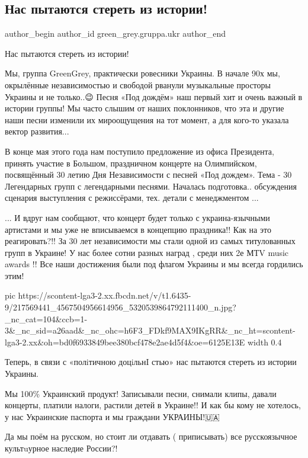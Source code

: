  
 
 
 
 
 
\subsection{Нас пытаются стереть из истории!}
\label{sec:27_07_2021.fb.green_grey.gruppa.ukr.1.grin_grey_ofis_prezidenta_jazyk_mova}
 
\ifcmt
 author_begin
   author_id green_grey.gruppa.ukr
 author_end
\fi

Нас пытаются стереть из истории!

Мы, группа GreenGrey, практически ровесники Украины. В начале 90х мы,
окрылённые независимостью и свободой рванули музыкальные просторы Украины и не
только..😉 Песня «Под дождём» наш первый хит и очень важный в истории группы!
Мы часто слышим от наших поклонников, что эта и другие наши песни изменили их
мироощущения на тот момент, а для кого-то указала вектор развития...

В конце мая этого года нам поступило предложение из офиса Президента, принять
участие в Большом, праздничном концерте на Олимпийском, посвящённый 30 летию
Дня Независимости с песней «Под дождем». Тема - 30 Легендарных групп с
легендарными песнями. Началась подготовка.. обсуждения сценария выступления с
режиссёрами, тех. детали с менеджментом ...

... И вдруг нам сообщают, что концерт будет только с украина-язычными
артистами и мы уже не вписываемся в концепцию праздника!! Как на это
реагировать?!! За 30 лет независимости мы стали одной из самых титулованных
групп в Украине! У нас более сотни разных наград , среди них 2е МТV music
awards !! Все наши достижения были под флагом Украины и мы всегда гордились
этим!

\ifcmt
  pic https://scontent-lga3-2.xx.fbcdn.net/v/t1.6435-9/217569441_4567504956614956_5320539864792111400_n.jpg?_nc_cat=104&ccb=1-3&_nc_sid=a26aad&_nc_ohc=h6F3_FDkf9MAX9IKgRR&_nc_ht=scontent-lga3-2.xx&oh=bd0f6933849bee380bcf478e2ae4d5f4&oe=6125E13E
  width 0.4
\fi

Теперь, в связи с «полiтичною доцiльнI стью» нас пытаются стереть  из истории Украины.

Мы 100\% Украинский продукт! Записывали песни, снимали клипы, давали концерты,
платили налоги, растили детей в Украине!! И как бы кому не хотелось, у нас
Украинские паспорта и мы граждани УКРАИНЫ!🇺🇦

Да мы поём на русском, но стоит ли отдавать ( приписывать) все русскоязычное
культuурное наследие России?!



